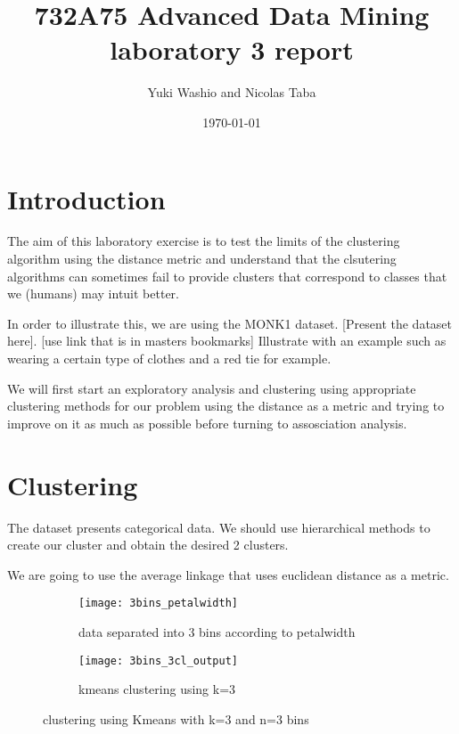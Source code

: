 \documentclass[letterpaper,12pt]{article}
\begin{document}
\title{732A75 Advanced Data Mining laboratory 3 report}
\author{Yuki Washio and Nicolas Taba}
\date{\today}
\maketitle



\section{Introduction}

The aim of this laboratory exercise is to test the limits of the clustering algorithm using the distance metric and understand that the clsutering algorithms can sometimes fail to provide clusters that correspond to classes that we (humans) may intuit better.

In order to illustrate this, we are using the MONK1 dataset.
[Present the dataset here]. [use link that is in masters bookmarks] Illustrate with an example such as wearing a certain type of clothes and a red tie for example.

We will first start an exploratory analysis and clustering using appropriate clustering methods for our problem using the distance as a metric and trying to improve on it as much as possible before turning to assosciation analysis.


\section{Clustering}

The dataset presents categorical data. We should use hierarchical methods to create our cluster and obtain the desired 2 clusters.

We are going to use the average linkage that uses euclidean distance as a metric.

\begin{figure}[H]
\begin{subfigure}{.5\textwidth}
  \centering
  \texttt{[image: 3bins\_petalwidth]}  
  \caption{data separated into 3 bins according to petalwidth}
  \label{fig:sub-first_1}
\end{subfigure}
\begin{subfigure}{.5\textwidth}
  \centering
  \texttt{[image: 3bins\_3cl\_output]}  
  \caption{kmeans clustering using k=3}
  \label{fig:sub-second_1}
\end{subfigure}
\caption{clustering using Kmeans with k=3 and n=3 bins}
\label{fig:fig_1}
\end{figure}
\end{document}
